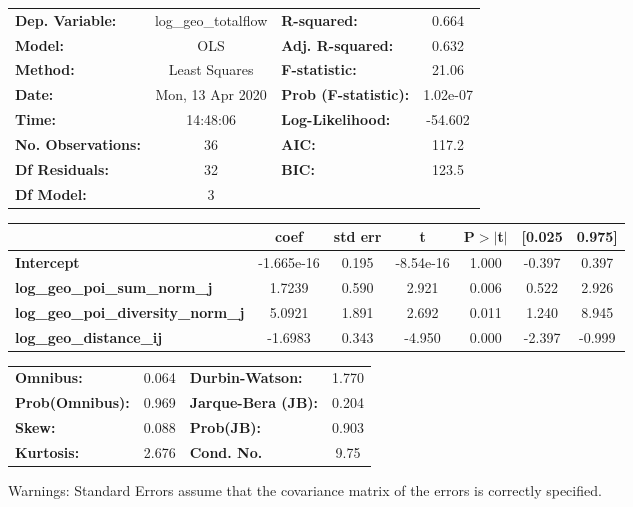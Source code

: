 \begin{center}
\begin{tabular}{lclc}
\toprule
\textbf{Dep. Variable:}                    & log\_geo\_totalflow & \textbf{  R-squared:         } &     0.664   \\
\textbf{Model:}                            &         OLS         & \textbf{  Adj. R-squared:    } &     0.632   \\
\textbf{Method:}                           &    Least Squares    & \textbf{  F-statistic:       } &     21.06   \\
\textbf{Date:}                             &   Mon, 13 Apr 2020  & \textbf{  Prob (F-statistic):} &  1.02e-07   \\
\textbf{Time:}                             &       14:48:06      & \textbf{  Log-Likelihood:    } &   -54.602   \\
\textbf{No. Observations:}                 &            36       & \textbf{  AIC:               } &     117.2   \\
\textbf{Df Residuals:}                     &            32       & \textbf{  BIC:               } &     123.5   \\
\textbf{Df Model:}                         &             3       & \textbf{                     } &             \\
\bottomrule
\end{tabular}
\begin{tabular}{lcccccc}
                                           & \textbf{coef} & \textbf{std err} & \textbf{t} & \textbf{P$> |$t$|$} & \textbf{[0.025} & \textbf{0.975]}  \\
\midrule
\textbf{Intercept}                         &   -1.665e-16  &        0.195     & -8.54e-16  &         1.000        &       -0.397    &        0.397     \\
\textbf{log\_geo\_poi\_sum\_norm\_j}       &       1.7239  &        0.590     &     2.921  &         0.006        &        0.522    &        2.926     \\
\textbf{log\_geo\_poi\_diversity\_norm\_j} &       5.0921  &        1.891     &     2.692  &         0.011        &        1.240    &        8.945     \\
\textbf{log\_geo\_distance\_ij}            &      -1.6983  &        0.343     &    -4.950  &         0.000        &       -2.397    &       -0.999     \\
\bottomrule
\end{tabular}
\begin{tabular}{lclc}
\textbf{Omnibus:}       &  0.064 & \textbf{  Durbin-Watson:     } &    1.770  \\
\textbf{Prob(Omnibus):} &  0.969 & \textbf{  Jarque-Bera (JB):  } &    0.204  \\
\textbf{Skew:}          &  0.088 & \textbf{  Prob(JB):          } &    0.903  \\
\textbf{Kurtosis:}      &  2.676 & \textbf{  Cond. No.          } &     9.75  \\
\bottomrule
\end{tabular}
\end{center}

Warnings: \newline
 [1] Standard Errors assume that the covariance matrix of the errors is correctly specified.